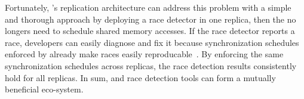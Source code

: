 Fortunately, \xxx's replication architecture can address this problem with a 
simple and thorough approach by deploying a race detector in one replica, then 
the \dmt no longers need to schedule shared memory accesses. If the race 
detector reports a race, developers can easily diagnose and fix it because 
synchronization schedules enforced by \dmt already make races easily 
reproducable~\cite{pres:sosp09}. By enforcing the same synchronization 
schedules across replicas, the race detection results consistently hold for all 
replicas. In sum, \xxx and race detection tools can form a mutually beneficial 
eco-system.
